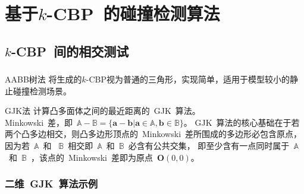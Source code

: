   \section{基于$k$-CBP~的碰撞检测算法}
    
      \subsection{$k$-CBP~间的相交测试}
      \begin{frame}
        \frametitle{}
        \begin{block}{AABB树法}
          将生成的$k$-CBP视为普通的三角形，实现简单，适用于模型较小的静止碰撞检测场景。
        \end{block}
        \begin{block}{GJK法}
          计算凸多面体之间的最近距离的~GJK~算法\cite{bergen1999fast}。\\
          Minkowski~差，即~$\mathbb{A} - \mathbb{B} = \{ \bm{a} - \bm{b} | \bm{a} \in \mathbb{A}, \bm{b} \in \mathbb{B}\} $。
GJK~算法的核心基础在于若两个凸多边相交，则凸多边形顶点的~Minkowski~差所围成的多边形必包含原点，因为若~$\mathbb{A}$~和
~$\mathbb{B}$~相交即~$\mathbb{A}$~和~$\mathbb{B}$~必含有公共交集，
即至少含有一点同时属于~$\mathbb{A}$~和~$\mathbb{B}$~，该点的~Minkowski~差即为原点~$\bm{O}(0, 0)$。
        \end{block}
      \end{frame}

      \begin{frame}
        \frametitle{二维~GJK~算法示例}
        \begin{figure}[htbp]
        \end{figure}
      \end{frame}

